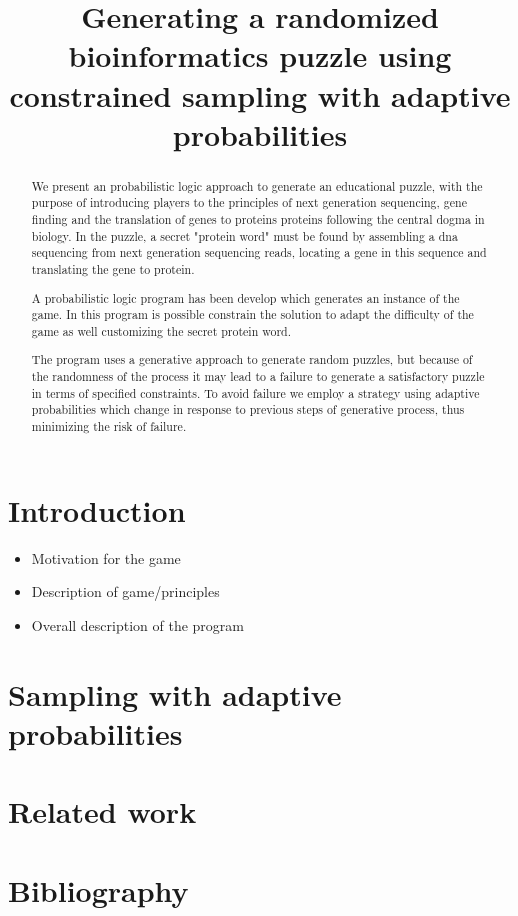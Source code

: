 \documentclass{article}
\begin{document}
\title{Generating a randomized bioinformatics puzzle using constrained sampling with adaptive probabilities}

\begin{abstract}
We present an probabilistic logic approach to generate an educational puzzle,
with the purpose of introducing players to the principles
of next generation sequencing, gene finding and the translation of genes to
proteins proteins following the central dogma in biology. 
In the puzzle, a secret "protein word" must be found by assembling a dna sequencing
from next generation sequencing reads, locating a gene in this sequence
and translating the gene to protein.

A probabilistic logic program has been develop which generates an
instance of the game. In this program is possible constrain the
solution to adapt the difficulty of the game as well customizing
the secret protein word.

The program uses a generative approach to generate random puzzles, but
because of the randomness of the process it 
may lead to a failure to generate a satisfactory puzzle in terms of specified constraints. 
To avoid failure we employ a strategy using adaptive probabilities which change in response
to previous steps of generative process, thus minimizing the risk of failure.
\end{abstract}


\section{Introduction}

\begin{itemize}
	\item Motivation for the game
	\item Description of game/principles
	\item Overall description of the program
\end{itemize}

\section{Sampling with adaptive probabilities}

\section{Related work}

\section{Bibliography}
\end{document}
